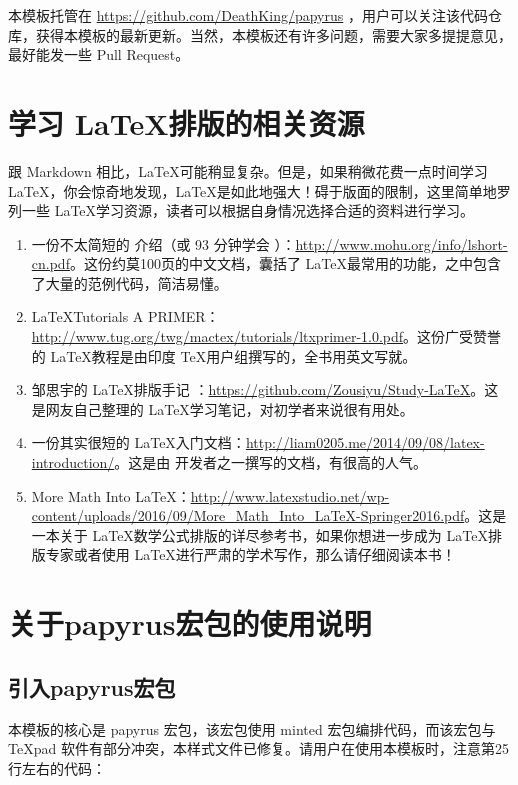 \documentclass[a4paper,UTF8]{ctexart}
\begin{document}
本模板托管在 \url{https://github.com/DeathKing/papyrus} ，用户可以关注该代码仓库，获得本模板的最新更新。当然，本模板还有许多问题，需要大家多提提意见，最好能发一些 Pull Request。

\section{学习 \LaTeX 排版的相关资源}

跟 Markdown 相比，\LaTeX 可能稍显复杂。但是，如果稍微花费一点时间学习 \LaTeX ，你会惊奇地发现，\LaTeX 是如此地强大！碍于版面的限制，这里简单地罗列一些 \LaTeX 学习资源，读者可以根据自身情况选择合适的资料进行学习。

\begin{enumerate}
	\item 一份不太简短的 \LaTeXe 介绍（或 93 分钟学会 \LaTeXe）：\url{http://www.mohu.org/info/lshort-cn.pdf}。这份约莫100页的中文文档，囊括了 \LaTeX 最常用的功能，之中包含了大量的范例代码，简洁易懂。
	\item \LaTeX Tutorials A PRIMER：\url{http://www.tug.org/twg/mactex/tutorials/ltxprimer-1.0.pdf}。这份广受赞誉的 \LaTeX 教程是由印度 \TeX 用户组撰写的，全书用英文写就。
	\item 邹思宇的 \LaTeX 排版手记 ：\url{https://github.com/Zousiyu/Study-LaTeX}。这是网友自己整理的 \LaTeX 学习笔记，对初学者来说很有用处。
	\item 一份其实很短的 \LaTeX 入门文档：\url{http://liam0205.me/2014/09/08/latex-introduction/}。这是由 \CTeX 开发者之一撰写的文档，有很高的人气。
	\item More Math Into \LaTeX ：\url{http://www.latexstudio.net/wp-content/uploads/2016/09/More_Math_Into_LaTeX-Springer2016.pdf}。这是一本关于 \LaTeX 数学公式排版的详尽参考书，如果你想进一步成为 \LaTeX 排版专家或者使用 \LaTeX 进行严肃的学术写作，那么请仔细阅读本书！
\end{enumerate}


\section{关于papyrus宏包的使用说明}

\subsection{引入papyrus宏包}

本模板的核心是 papyrus 宏包，该宏包使用 minted 宏包编排代码，而该宏包与 TeXpad 软件有部分冲突，本样式文件已修复。请用户在使用本模板时，注意第25行左右的代码：
\end{document}
